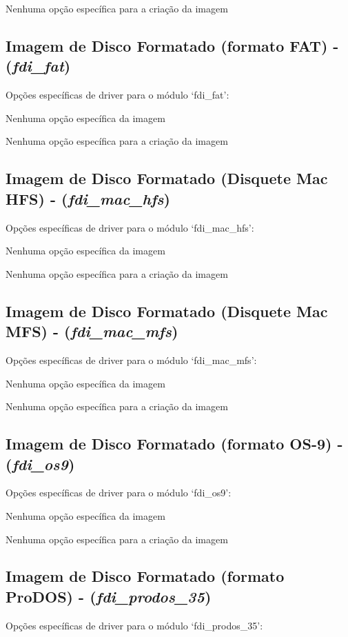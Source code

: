 \documentclass[letterpaper,10pt,brazil]{sphinxmanual}
\begin{document}
Nenhuma opção específica para a criação da imagem


\subsection{Imagem de Disco Formatado (formato FAT) - (\emph{fdi\_fat})}
\label{tools/imgtool:imagem-de-disco-formatado-formato-fat-fdi-fat}
Opções específicas de driver para o módulo `fdi\_fat':

Nenhuma opção específica da imagem

Nenhuma opção específica para a criação da imagem


\subsection{Imagem de Disco Formatado (Disquete Mac HFS) - (\emph{fdi\_mac\_hfs})}
\label{tools/imgtool:imagem-de-disco-formatado-disquete-mac-hfs-fdi-mac-hfs}
Opções específicas de driver para o módulo `fdi\_mac\_hfs':

Nenhuma opção específica da imagem

Nenhuma opção específica para a criação da imagem


\subsection{Imagem de Disco Formatado (Disquete Mac MFS) - (\emph{fdi\_mac\_mfs})}
\label{tools/imgtool:imagem-de-disco-formatado-disquete-mac-mfs-fdi-mac-mfs}
Opções específicas de driver para o módulo `fdi\_mac\_mfs':

Nenhuma opção específica da imagem

Nenhuma opção específica para a criação da imagem


\subsection{Imagem de Disco Formatado (formato OS-9) - (\emph{fdi\_os9})}
\label{tools/imgtool:imagem-de-disco-formatado-formato-os-9-fdi-os9}
Opções específicas de driver para o módulo `fdi\_os9':

Nenhuma opção específica da imagem

Nenhuma opção específica para a criação da imagem


\subsection{Imagem de Disco Formatado (formato ProDOS) - (\emph{fdi\_prodos\_35})}
\label{tools/imgtool:imagem-de-disco-formatado-formato-prodos-fdi-prodos-35}
Opções específicas de driver para o módulo `fdi\_prodos\_35':
\end{document}
